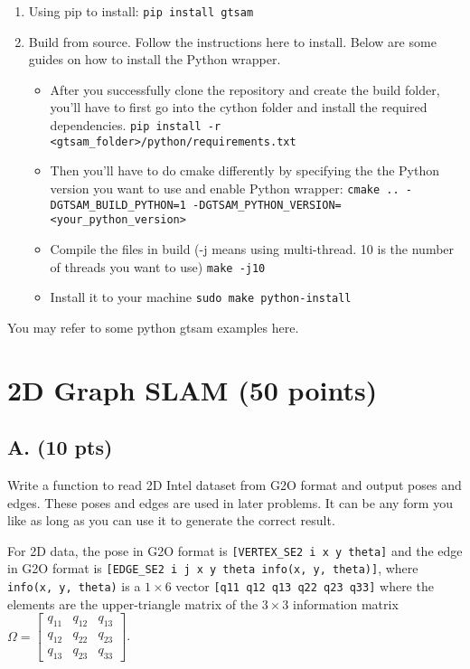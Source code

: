 \documentclass{article}
\begin{document}
\begin{enumerate}
    \item Using pip to install: \texttt{pip install gtsam}
    \item Build from source. Follow the instructions here to install. Below are some guides on how to install the Python wrapper.
    \begin{itemize}
        \item After you successfully clone the repository and create the build folder, you'll have to first go into the cython folder and install the required dependencies. \texttt{pip install -r <gtsam\_folder>/python/requirements.txt}
        \item Then you'll have to do cmake differently by specifying the the Python version you want to use and enable Python wrapper: \texttt{cmake .. -DGTSAM\_BUILD\_PYTHON=1 -DGTSAM\_PYTHON\_VERSION=<your\_python\_version>}
        \item Compile the files in build (-j means using multi-thread. 10 is the number of threads you want to use) \texttt{make -j10}
        \item Install it to your machine \texttt{sudo make python-install}
    \end{itemize}
\end{enumerate}

You may refer to some python gtsam examples here.

\section{2D Graph SLAM (50 points)}
\subsection{A. (10 pts)}
Write a function to read 2D Intel dataset from G2O format and output poses and edges. These poses and edges are used in later problems. It can be any form you like as long as you can use it to generate the correct result.

For 2D data, the pose in G2O format is \texttt{[VERTEX\_SE2 i x y theta]} and the edge in G2O format is \texttt{[EDGE\_SE2 i j x y theta info(x, y, theta)]}, where \texttt{info(x, y, theta)} is a $1 \times 6$ vector \texttt{[q11 q12 q13 q22 q23 q33]} where the elements are the upper-triangle matrix of the $3 \times 3$ information matrix $\Omega = \begin{bmatrix} q_{11} & q_{12} & q_{13} \\ q_{12} & q_{22} & q_{23} \\ q_{13} & q_{23} & q_{33} \end{bmatrix}$.
\end{document}
